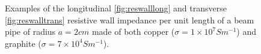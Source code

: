 \begin{figure}

\caption{Examples of the longitudinal \ref{fig:reswalllong} and transverse \ref{fig:reswalltrans} resistive wall impedance per unit length of a beam pipe of radius $a = 2cm$ made of both copper ($\sigma = 1 \times 10^{7} S m^{-1}$) and graphite ($\sigma = 7 \times 10^{4} S m^{-1}$).}
\label{fig:resWallImpComp}
\end{figure}

